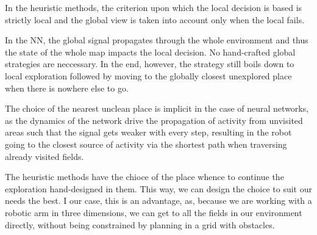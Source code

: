 \documentclass[buriama8_dp.tex]{subfiles}
\begin{document}
In the heuristic methods, the criterion upon which the local decision is based is strictly local and the global view is taken into account only when the local fails.

In the NN, the global signal propagates through the whole environment and thus the state of the whole map impacts the local decision. No hand-crafted global strategies are neccessary. In the end, however, the strategy still boils down to local exploration followed by moving to the globally closest unexplored place when there is nowhere else to go.

The choice of the nearest unclean place is implicit  in the case of neural networks, as the dynamics of the network drive the propagation of activity from unvisited areas such that the signal gets weaker with every step, resulting in the robot going to the closest source of activity via the shortest path when traversing already visited fields.

The heuristic methods have the chioce of the place whence to continue the exploration hand-designed in them. This way, we can design the choice to suit our needs the best.  I our case, this is an advantage, as, because we are working with a robotic arm in three dimensions, we can get to all the fields in our environment directly, without being constrained by planning in a grid with obstacles.
\end{document}
